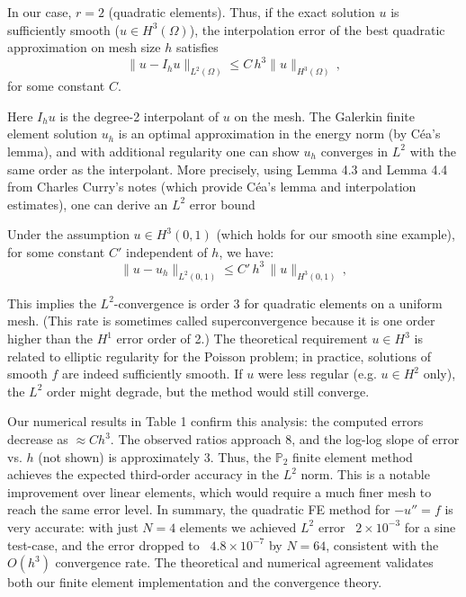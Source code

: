 \documentclass[a4paper,10pt]{article}
\begin{document}
In our case, \(r=2\) (quadratic elements).
Thus, if the exact solution \(u\) is sufficiently smooth (\(u \in H^3(\Omega)\)), the interpolation error of the best quadratic approximation on mesh size \(h\) satisfies
\[ \|u - I_h u\|_{L^2(\Omega)} \le C\,h^3 \|u\|_{H^3(\Omega)}\, ,\]
for some constant \(C\).


Here \(I_h u\) is the degree-2 interpolant of \(u\) on the mesh. The Galerkin finite element solution \(u_h\) is an optimal approximation in the energy norm (by Céa's lemma), and with additional regularity one can show \(u_h\) converges in \(L^2\) with the same order as the interpolant.
More precisely, using Lemma 4.3 and Lemma 4.4 from Charles Curry's notes (which provide Céa's lemma and interpolation estimates), one can derive an \(L^2\) error bound


Under the assumption \(u \in H^3(0,1)\) (which holds for our smooth sine example), for some constant \(C'\) independent of \(h\), we have:
\[
	\|u - u_h\|_{L^2(0,1)} \le C'\,h^3\,\|u\|_{H^3(0,1)}\,,
\]

This implies the \(L^2\)-convergence is order 3 for quadratic elements on a uniform mesh.
(This rate is sometimes called superconvergence because it is one order higher than the \(H^1\) error order of 2.)
The theoretical requirement \(u\in H^3\) is related to elliptic regularity for the Poisson problem; in practice, solutions of smooth \(f\) are indeed sufficiently smooth.
If \(u\) were less regular (e.g. \(u\in H^2\) only), the \(L^2\) order might degrade, but the method would still converge.

Our numerical results in Table 1 confirm this analysis: the computed errors decrease as \(\approx C h^3\). The observed ratios approach 8, and the log-log slope of error vs. \(h\) (not shown) is approximately 3. Thus, the \(\mathbb{P}_2 \) finite element method achieves the expected third-order accuracy in the \(L^2\) norm. This is a notable improvement over linear elements, which would require a much finer mesh to reach the same error level. In summary, the quadratic FE method for \(-u''=f\) is very accurate: with just \(N=4\) elements we achieved \(L^2\) error ~\(2\times10^{-3}\) for a sine test-case, and the error dropped to ~\(4.8\times10^{-7}\) by \(N=64\), consistent with the \(O(h^3)\) convergence rate. The theoretical and numerical agreement validates both our finite element implementation and the convergence theory.
\end{document}

